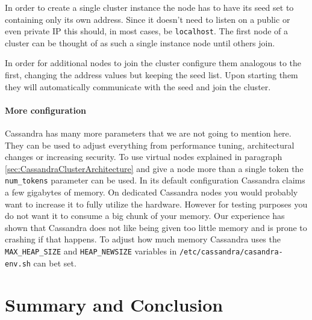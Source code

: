 In order to create a single cluster instance the node has to have its seed set to containing only its own address. Since it doesn't need to listen on a public or even private IP this should, in most cases, be \texttt{localhost}.
The first node of a cluster can be thought of as such a single instance node until others join.

In order for additional nodes to join the cluster configure them analogous to the first, changing the address values but keeping the seed list.
Upon starting them they will automatically communicate with the seed and join the cluster.

\paragraph{More configuration} Cassandra has many more parameters that we are not going to mention here. They can be used to adjust everything from performance tuning, architectural changes or increasing security.
To use virtual nodes explained in paragraph \ref{sec:CassandraClusterArchitecture} and give a node more than a single token the \texttt{num\_tokens} parameter can be used.
In its default configuration Cassandra claims a few gigabytes of memory. On dedicated Cassandra nodes you would probably want to increase it to fully utilize the hardware. However for testing purposes you do not want it to consume a big chunk of your memory. Our experience has shown that Cassandra does not like being given too little memory and is prone to crashing if that happens. To adjust how much memory Cassandra uses the \texttt{MAX\_HEAP\_SIZE} and \texttt{HEAP\_NEWSIZE} variables in \texttt{/etc/cassandra/casandra-env.sh} can bet set.

\section{Summary and Conclusion}
    
